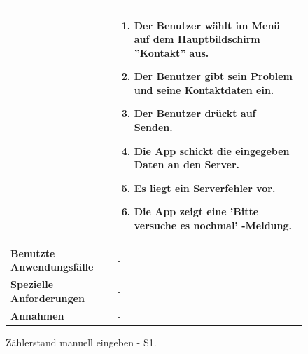 \begin{figure}[h]
	\centering
	\begin{tabularx}{\textwidth}{ X | X }
&
		\begin{enumerate}
			\item Der Benutzer wählt im Menü auf dem Hauptbildschirm ''Kontakt'' aus. 
			\item Der Benutzer gibt sein Problem und seine Kontaktdaten ein.
			\item Der Benutzer drückt auf Senden.
			\item Die App schickt die eingegeben Daten an den Server.
			\item Es liegt ein Serverfehler vor.
			\item Die App zeigt eine 'Bitte versuche es nochmal' -Meldung.
		\end{enumerate} \\ \hline
		\textbf{Benutzte Anwendungsfälle} & - \\ \hline
		\textbf{Spezielle Anforderungen} & - \\ \hline
		\textbf{Annahmen} & -
	\end{tabularx}
	\caption{Zählerstand manuell eingeben - S1.}
	\label{fig:anwendungsfall-server-tabelle-xx-1}
\end{figure}
